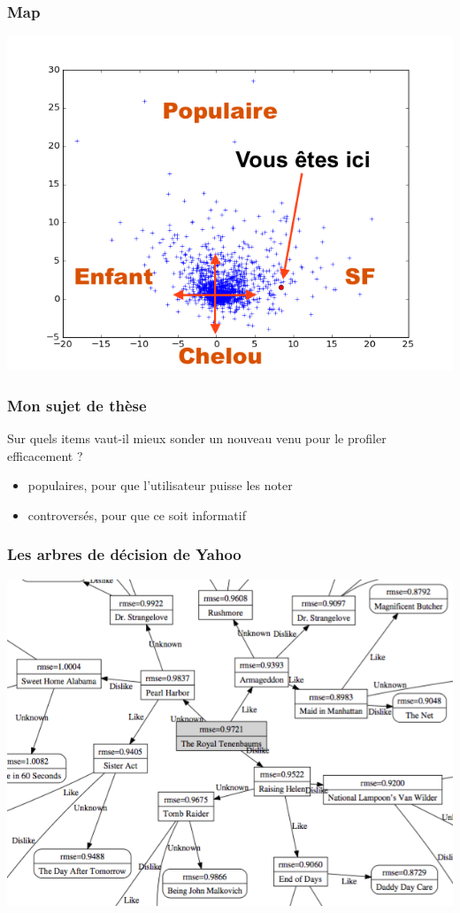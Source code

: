 \documentclass[handout]{beamer}
\begin{document}
\begin{frame}
	\frametitle{Map}
	\includegraphics[width=\linewidth]{figures/here.png}
\end{frame}

\begin{frame}
	\frametitle{Mon sujet de thèse}
	Sur quels items vaut-il mieux sonder un nouveau venu pour le profiler efficacement ?
	\pause
	\begin{itemize}[<+->]
	\item \alert{populaires}, pour que l'utilisateur puisse les noter
	\item \alert{controversés}, pour que ce soit informatif
	\end{itemize}\bigskip
\end{frame}

\begin{frame}
	\frametitle{Les arbres de décision de Yahoo}
	\includegraphics[width=\linewidth]{figures/decisiontree.png}
\end{frame}
\end{document}
